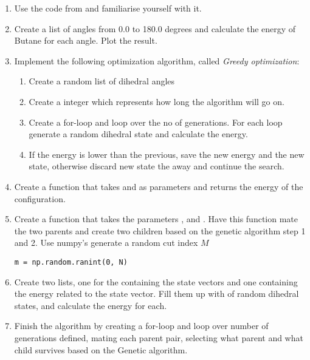 \documentclass{article}
\begin{document}
\begin{enumerate}
  \item Use the code from  and familiarise yourself with it.

  \item Create a list of angles from 0.0 to 180.0 degrees and calculate the energy
  of Butane for each angle. Plot the result.

  \item Implement the following optimization algorithm, called \textit{Greedy optimization}:
    \begin{enumerate}
      \item Create a random list of dihedral angles
      \item Create a integer  which represents
        how long the algorithm will go on.
      \item Create a for-loop and loop over the no of generations.
        For each loop generate a random dihedral state and calculate the energy.
      \item If the energy is lower than the previous, save the new energy and the new state,
        otherwise discard new state the away and continue the search.
    \end{enumerate}

  \item Create a function that takes  and  as
    parameters and returns the energy of the configuration.

  \item Create a function that takes the parameters
    ,
     and
    .
    Have this function mate the two parents and
    create two children based on the genetic algorithm
    step 1 and 2. Use numpy's  generate a random cut index $M$

\begin{lstlisting}
m = np.random.ranint(0, N)
\end{lstlisting}

  \item Create two lists, one for the containing the state vectors
    and one containing the energy related to the state vector.
    Fill them up with  of random dihedral states,
    and calculate the energy for each.

  \item Finish the algorithm by creating a for-loop and loop over
    number of generations defined,
    mating each parent pair, selecting what parent and what child
    survives based on the Genetic algorithm.

\end{enumerate}
\end{document}

